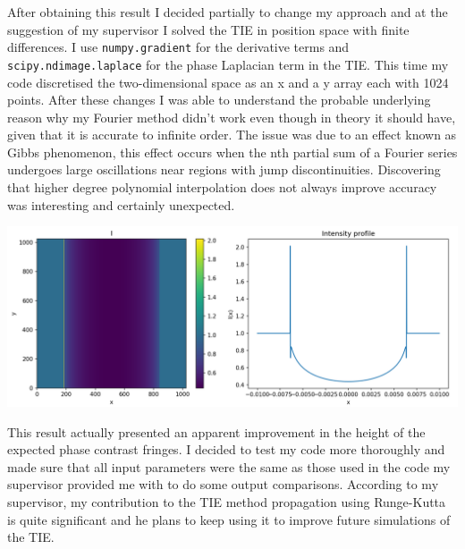 \documentclass[9pt, a4paper]{article}
\newenvironment{Figure}
    {\par\medskip\noindent\minipage{\linewidth}}
    {\endminipage\par\medskip}
\begin{document}
After obtaining this result I decided partially to change my approach and at the suggestion of my supervisor I solved the TIE in position space with finite differences. I use \texttt{numpy.gradient} for the derivative terms and \texttt{scipy.ndimage.laplace} for the phase Laplacian term in the TIE. This time my code discretised the two-dimensional space as an x and a y array each with 1024 points. 
After these changes I was able to understand the probable underlying reason why my Fourier method didn't work even though in theory it should have, given that it is accurate to infinite order\cite{Chris}\cite{Fornberg}. The issue was due to an effect known as Gibbs phenomenon, this effect occurs when the nth partial sum of a Fourier series undergoes large oscillations near regions with jump discontinuities\cite{Gibbs}. Discovering that higher degree polynomial interpolation does not always improve accuracy was interesting and certainly unexpected.
\begin{Figure}
\centering
\includegraphics[width=\linewidth]{FD_intensity_profile.pdf}
\end{Figure}
This result actually presented an apparent improvement in the height of the expected phase contrast fringes. I decided to test my code more thoroughly and made sure that all input parameters were the same as those used in the code my supervisor provided me with to do some output comparisons. According to my supervisor, my contribution to the TIE method propagation using Runge-Kutta is quite significant and he plans to keep using it to improve future simulations of the TIE.
\end{document}
